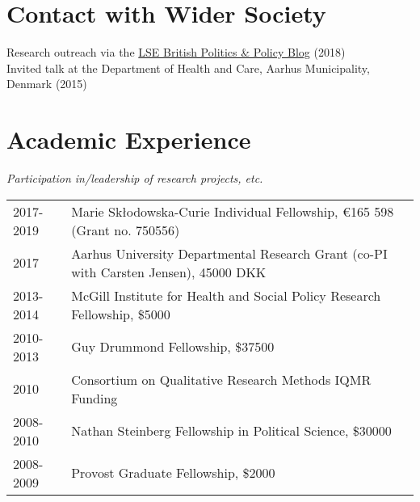 \documentclass[letterpaper,fontsize=10pt]{scrartcl}
\begin{document}
	\section{Contact with Wider Society}
	\vspace{-1em}
	Research outreach via the \href{http://blogs.lse.ac.uk/politicsandpolicy/how-claims-about-welfare-benefit-levels-affect-public-opinion/}{LSE British Politics \& Policy Blog} (2018)\\
	Invited talk at the Department of Health and Care, Aarhus Municipality, Denmark (2015)

	\section{Academic Experience}
	\vspace{-1em}
	\textit{Participation in/leadership of research projects, etc.}
	\vspace{-1em}
	\begin{tabularx}{\textwidth}{@{} l X @{} }
		2017-2019 & Marie Skłodowska-Curie Individual Fellowship, €165 598 (Grant no. 750556)\\
		2017 & Aarhus University Departmental Research Grant (co-PI with Carsten Jensen), 45000 DKK\\
		2013-2014 & McGill Institute for Health and Social Policy Research Fellowship, \$5000\\
		2010-2013 & Guy Drummond Fellowship, \$37500\\
		2010 & Consortium on Qualitative Research Methods IQMR Funding\\
		2008-2010 & Nathan Steinberg Fellowship in Political Science, \$30000\\
		2008-2009 & Provost Graduate Fellowship, \$2000
	\end{tabularx}
\end{document}
